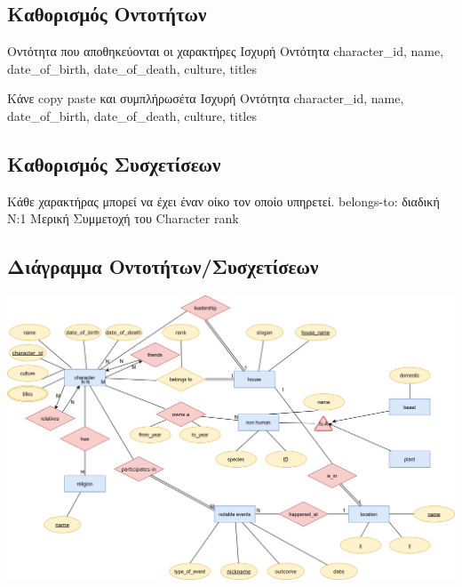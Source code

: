 \documentclass[../main.tex]{subfiles}
\begin{document}
\subsection{Καθορισμός Οντοτήτων}

{Οντότητα που αποθηκεύονται οι χαρακτήρες}
{Ισχυρή Οντότητα}
{character\_id, name, date\_of\_birth, date\_of\_death, culture, titles}

{Κάνε copy paste και συμπλήρωσέτα}
{Ισχυρή Οντότητα}
{character\_id, name, date\_of\_birth, date\_of\_death, culture, titles}



\subsection{Καθορισμός Συσχετίσεων}

{Κάθε χαρακτήρας μπορεί να έχει έναν οίκο τον οποίο υπηρετεί.}
{belongs-to: διαδική}
{N:1}
{Μερική Συμμετοχή του Character}
{rank}


\subsection{Διάγραμμα Οντοτήτων/Συσχετίσεων}
\includegraphics[width=\textwidth]{../images/entity_relation_diagram.png}
\end{document}

